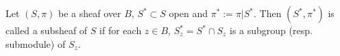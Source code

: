 Let $(S, \pi)$ be a sheaf over $B$, $S^* \subset S$ open and $\pi^* := \pi|S^*$. Then $(S^*, \pi^*)$ is called a subsheaf of $S$ if for each $z \in B$, $S^*_z = S^* \cap S_z$ is a subgroup (resp. submodule) of $S_z$.
